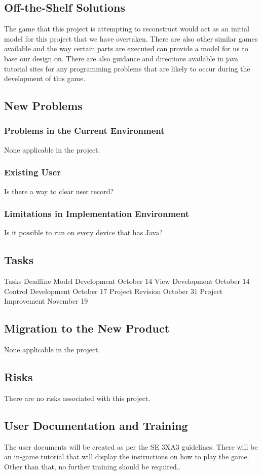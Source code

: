 \documentclass[12pt,letterpaper]{article}
\begin{document}
\subsection{Off-the-Shelf Solutions}
The game that this project is attempting to reconstruct would act as an initial model for this project that we have overtaken. There are also other similar games available and the way certain parts are executed can provide a model for us to base our design on. There are also guidance and directions available in java tutorial sites for any programming problems that are likely to occur during the development of this game.  
\subsection{New Problems}
\subsubsection{Problems in the Current Environment}
None applicable in the project.
\subsubsection{Existing User}
Is there a way to clear user record?
\subsubsection{Limitations in Implementation Environment} 
Is it possible to run on every device that has Java?
\subsection{Tasks}
Tasks Deadline
Model Development October 14
View Development October 14
Control Development October 17
Project Revision October 31
Project Improvement November 19
\subsection{Migration to the New Product}
None applicable in the project.
\subsection{Risks}
There are no risks associated with this project.
\subsection{User Documentation and Training}
The user documents will be created as per the SE 3XA3 guidelines.
There will be an in-game tutorial that will display the instructions on how to play the game. Other than that, no further training should be required..
\end{document}
